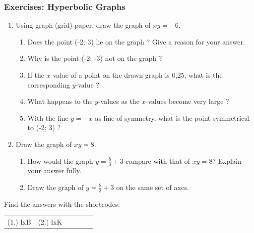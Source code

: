             \subsubsection{Exercises: Hyperbolic Graphs }
            \nopagebreak
          \label{m39341*id249267}\begin{enumerate}[noitemsep, label=\textbf{\arabic*}. ] 
            \label{m39341*uid163}\item Using graph (grid) paper, draw the graph of $xy=-6$.
\label{m39341*id249301}\begin{enumerate}[noitemsep, label=\textbf{\alph*}. ] 
            \label{m39341*uid164}\item Does the point (-2; 3) lie on the graph ? Give a reason for your answer.
\label{m39341*uid165}\item Why is the point (-2; -3) not on the graph ?
\label{m39341*uid166}\item If the $x$-value of a point on the drawn graph is 0,25, what is the corresponding $y$-value ?
\label{m39341*uid167}\item What happens to the $y$-values as the $x$-values become very large ?
\label{m39341*uid168}\item With the line $y=-x$ as line of symmetry, what is the point symmetrical to (-2; 3) ?
\end{enumerate}
                \label{m39341*uid169}\item Draw the graph of $xy=8$.
\label{m39341*id249462}\begin{enumerate}[noitemsep, label=\textbf{\alph*}. ] 
            \label{m39341*uid170}\item How would the graph $y=\frac{8}{3}+3$ compare with that of $xy=8$? Explain your answer fully.
\label{m39341*uid171}\item Draw the graph of $y=\frac{8}{3}+3$ on the same set of axes.
\end{enumerate}
                \end{enumerate}
  \label{m39341**end}
\par {} Find the answers with the shortcodes:
 \par \begin{tabular}[h]{cccccc}
 (1.) lxB  &  (2.) lxK  & \end{tabular}
% 
%     
%     
%     
%     
%     
%     
      \label{m39348*uid172}

